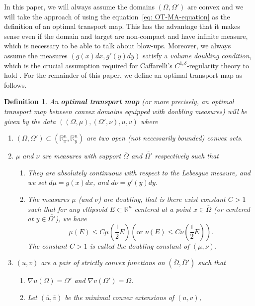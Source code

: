 \documentclass[12pt,reqno]{amsart}
\newtheorem{defn}{Definition}[section]
\numberwithin{equation}{section}
\begin{document}
In this paper, we will always assume the domains $(\Omega, \Omega')$ are convex and we will take the approach of using the equation~\eqref{eq: OT-MA-equation} as the definition of an optimal transport map. This has the advantage that it makes sense even if the domain and target are non-compact and have infinite measure, which is necessary to be able to talk about blow-ups. Moreover, we always assume the measures $(g(x)dx, g'(y)dy)$ satisfy a {\em volume doubling condition}, which is the crucial assumption required for Caffarelli's $C^{1, \delta}$-regularity theory to hold \cite{Caffarelli2, Jhaveri-Savin}. For the remainder of this paper, we define an optimal transport map as follows. 

\begin{defn}
    An {\bf optimal transport map} (or more precisely, an optimal transport map between convex domains equipped with doubling measures) will be given by the data $((\Omega, \mu), (\Omega', \nu), u, v)$ where
    \begin{enumerate}
        \item $(\Omega, \Omega')\subset (\mathbb R^n_x, \mathbb R^n_y)$ are two open (not necessarily bounded) convex sets. 
        \item $\mu$ and $\nu$ are measures with support $\overline\Omega$ and $\overline{\Omega'}$ respectively such that
        \begin{enumerate}
            \item They are absolutely continuous with respect to the Lebesgue measure, and we set $d\mu = g(x)dx$, and $d\nu = g'(y)dy$. 
            \item The measures $\mu$ (and $\nu$) are doubling, that is there exist constant $C>1$ such that for any ellipsoid $E\subset \mathbb R^n$ centered at a point $x\in\overline\Omega$ (or centered at $y\in\overline{\Omega'}$), we have
            \[\mu(E)\leq C\mu(\frac{1}{2}E) \left(\text{or  }\nu(E)\leq C\nu(\frac{1}{2}E)\right). \]
            The constant $C>1$ is called the doubling constant of $(\mu, \nu)$. 
        \end{enumerate}
        \item $(u, v)$ are a pair of strictly convex functions on $(\overline\Omega, \overline\Omega')$ such that
        \begin{enumerate}
            \item $\nabla u(\Omega) = \Omega'$ and $\nabla v(\Omega') = \Omega$. 
            \item Let $(\bar u, \bar v)$ be the minimal convex extensions of $(u, v)$,

\end{enumerate}
\end{enumerate}
\end{defn}
\end{document}
